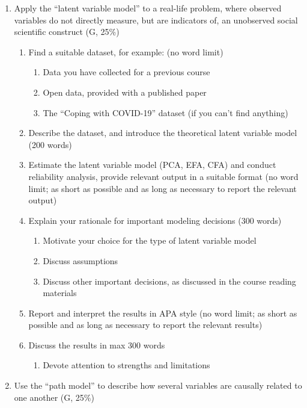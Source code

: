 \documentclass[
  letterpaper,
]{scrbook}
\providecommand{\tightlist}{%
  \setlength{\itemsep}{0pt}\setlength{\parskip}{0pt}}\usepackage{longtable,booktabs,array}
\begin{document}
\begin{enumerate}
\def\labelenumi{\arabic{enumi}.}
\tightlist
\item
  Apply the ``latent variable model'' to a real-life problem, where
  observed variables do not directly measure, but are indicators of, an
  unobserved social scientific construct (G, 25\%)

  \begin{enumerate}
  \def\labelenumii{\alph{enumii}.}
  \tightlist
  \item
    Find a suitable dataset, for example: (no word limit)

    \begin{enumerate}
    \def\labelenumiii{\roman{enumiii}.}
    \tightlist
    \item
      Data you have collected for a previous course
    \item
      Open data, provided with a published paper
    \item
      The ``Coping with COVID-19'' dataset (if you can't find anything)
    \end{enumerate}
  \item
    Describe the dataset, and introduce the theoretical latent variable
    model (200 words)
  \item
    Estimate the latent variable model (PCA, EFA, CFA) and conduct
    reliability analysis, provide relevant output in a suitable format
    (no word limit; as short as possible and as long as necessary to
    report the relevant output)
  \item
    Explain your rationale for important modeling decisions (300 words)

    \begin{enumerate}
    \def\labelenumiii{\roman{enumiii}.}
    \tightlist
    \item
      Motivate your choice for the type of latent variable model
    \item
      Discuss assumptions
    \item
      Discuss other important decisions, as discussed in the course
      reading materials
    \end{enumerate}
  \item
    Report and interpret the results in APA style (no word limit; as
    short as possible and as long as necessary to report the relevant
    results)
  \item
    Discuss the results in max 300 words

    \begin{enumerate}
    \def\labelenumiii{\roman{enumiii}.}
    \tightlist
    \item
      Devote attention to strengths and limitations
    \end{enumerate}
  \end{enumerate}
\item
  Use the ``path model'' to describe how several variables are causally
  related to one another (G, 25\%)


\end{enumerate}
\end{document}
